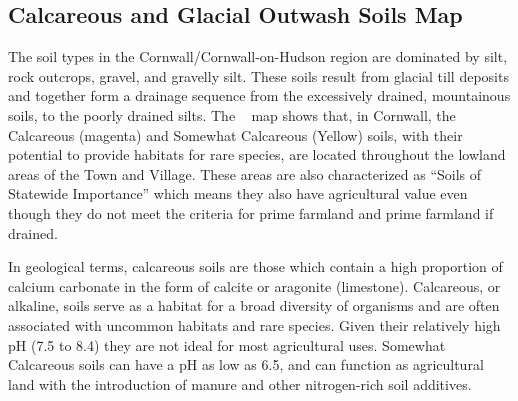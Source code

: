
\label{map:calcaerousandglacialoutwashsoils}
\subsection*{Calcareous and Glacial Outwash Soils Map}\label{subsec:calcareous}
The soil types in the Cornwall/Cornwall-on-Hudson region are dominated by silt, 
rock outcrops, gravel, and gravelly silt. These soils result from glacial till 
deposits and together form a drainage sequence from the excessively drained, 
mountainous soils, to the poorly drained silts. The ~
map shows that, in Cornwall, the Calcareous (magenta) and Somewhat 
Calcareous (Yellow) soils, with their potential to provide habitats for rare 
species, are located throughout the lowland areas of the Town and Village. These 
areas are also characterized as “Soils of Statewide Importance” which means they 
also have agricultural value even though they do not meet the criteria for prime 
farmland and prime farmland if drained.

In geological terms, calcareous soils are those which contain a high proportion 
of calcium carbonate in the form of calcite or aragonite (limestone). 
Calcareous, or alkaline, soils serve as a habitat for a broad diversity of 
organisms and are often associated with uncommon habitats and rare species. 
Given their relatively high pH (7.5 to 8.4) they are not ideal for most 
agricultural uses. Somewhat Calcareous soils can have a pH as low as 6.5, and 
can function as agricultural land with the introduction of manure and other 
nitrogen-rich soil additives.